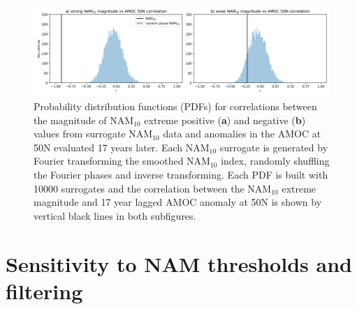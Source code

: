 \begin{center}
\begin{figure}[h!]
\noindent\includegraphics[width = \linewidth]{Figures/Figures-surface/correlation_stat_sigs.png}
\caption{Probability distribution functions (PDFs) for correlations between the magnitude of NAM$_{10}$ extreme positive (\textbf{a}) and negative (\textbf{b}) values from surrogate NAM$_{10}$ data and anomalies in the AMOC at 50N evaluated 17 years later. Each NAM$_{10}$ surrogate is generated by Fourier transforming the smoothed NAM$_{10}$ index, randomly shuffling the Fourier phases and inverse transforming. Each PDF is built with 10000 surrogates and the correlation between the NAM$_{10}$ extreme magnitude and 17 year lagged AMOC anomaly at 50N is shown by vertical black lines in both subfigures.}
\label{cors_stat_sigs}
\end{figure}
\end{center}

\section{Sensitivity to NAM thresholds and filtering}









